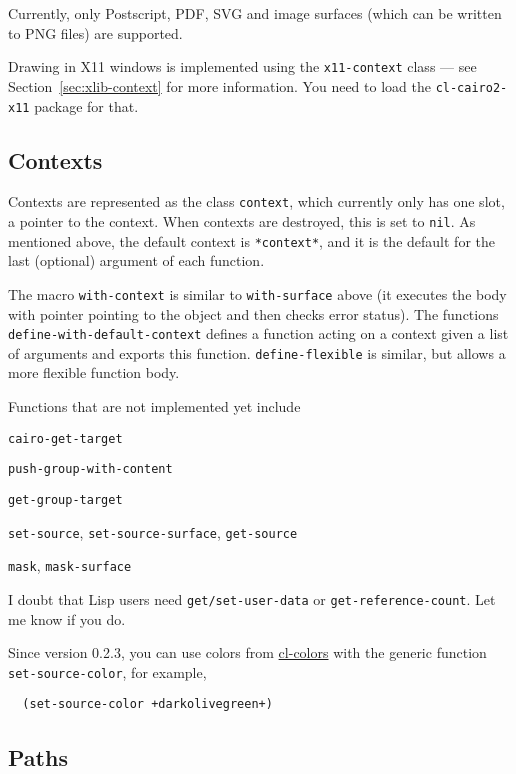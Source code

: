 \documentclass[12pt,letterpaper,dvipdfm]{article}
\begin{document}
Currently, only Postscript, PDF, SVG and image surfaces (which can be
written to PNG files) are supported.

Drawing in X11 windows is implemented using the
\lstinline!x11-context! class --- see Section~\ref{sec:xlib-context}
for more information.  You need to load the \lstinline!cl-cairo2-x11!
package for that.

\subsection{Contexts}
\label{sec:contexts}

Contexts are represented as the class \lstinline!context!, which
currently only has one slot, a pointer to the context.  When contexts
are destroyed, this is set to \lstinline!nil!.  As mentioned above,
the default context is \lstinline!*context*!, and it is the default
for the last (optional) argument of each function.

The macro \lstinline!with-context! is similar to
\lstinline!with-surface! above (it executes the body with pointer
pointing to the object and then checks error status).  The functions
\lstinline!define-with-default-context! defines a function acting on a
context given a list of arguments and exports this function.
\lstinline!define-flexible! is similar, but allows a more flexible
function body.

Functions that are not implemented yet include
\begin{compactitem}
  \item \lstinline!cairo-get-target!
  \item \lstinline!push-group-with-content!
  \item \lstinline!get-group-target!
  \item \lstinline!set-source!, \lstinline!set-source-surface!,
    \lstinline!get-source!
  \item \lstinline!mask!, \lstinline!mask-surface!
\end{compactitem}
I doubt that Lisp users need \lstinline!get/set-user-data! or
\lstinline!get-reference-count!.  Let me know if you do.

Since version 0.2.3, you can use colors from
\href{http://www.cliki.net/cl-colors}{cl-colors} with the generic
function \lstinline!set-source-color!, for example,
\begin{lstlisting}
  (set-source-color +darkolivegreen+)
\end{lstlisting}


\subsection{Paths}
\label{sec:paths}
\end{document}
